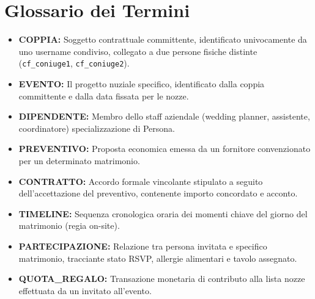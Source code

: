 \section{Glossario dei Termini}
\begin{itemize}[leftmargin=*,noitemsep]
    \item \textbf{COPPIA:} Soggetto contrattuale committente, identificato univocamente da uno username condiviso, collegato a due persone fisiche distinte (\texttt{cf\_coniuge1}, \texttt{cf\_coniuge2}).
    \item \textbf{EVENTO:} Il progetto nuziale specifico, identificato dalla coppia committente e dalla data fissata per le nozze.
    \item \textbf{DIPENDENTE:} Membro dello staff aziendale (wedding planner, assistente, coordinatore) specializzazione di Persona.
    \item \textbf{PREVENTIVO:} Proposta economica emessa da un fornitore convenzionato per un determinato matrimonio.
    \item \textbf{CONTRATTO:} Accordo formale vincolante stipulato a seguito dell'accettazione del preventivo, contenente importo concordato e acconto.
    \item \textbf{TIMELINE:} Sequenza cronologica oraria dei momenti chiave del giorno del matrimonio (regia on-site).
    \item \textbf{PARTECIPAZIONE:} Relazione tra persona invitata e specifico matrimonio, tracciante stato RSVP, allergie alimentari e tavolo assegnato.
    \item \textbf{QUOTA\_REGALO:} Transazione monetaria di contributo alla lista nozze effettuata da un invitato all'evento.
\end{itemize}

